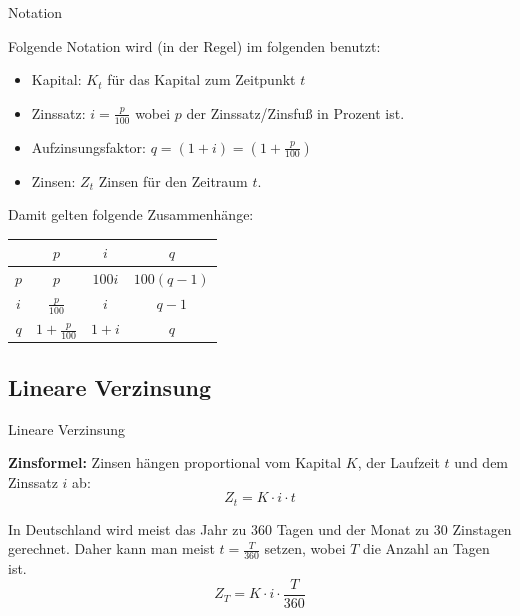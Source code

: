 \begin{frame}{Notation}
	\begin{bemerkung}
		Folgende Notation wird (in der Regel) im folgenden benutzt:
		\begin{itemize}
			\item Kapital: $K_{t}$ für das Kapital zum Zeitpunkt $t$
			\item Zinssatz: $i = \frac{p}{100}$ wobei $p$ der Zinssatz/Zinsfuß in Prozent ist.
			\item Aufzinsungsfaktor: $q = \left( 1+i \right) = \left(1 + \frac{p}{100}\right) $
			\item Zinsen: $Z_{t}$ Zinsen für den Zeitraum $t$.
		\end{itemize}
		\begin{center}
		Damit gelten folgende Zusammenhänge:
		\begin{tabular}{|c||c|c|c|}
				\hline \rule[-2ex]{0pt}{5.5ex}  & $p$ & $i$ & $q$ \\ 
				\hline \hline \rule[-2ex]{0pt}{5.5ex} $p$ & $p$ & $100 i$ & $100(q-1)$ \\ 
				\hline \rule[-2ex]{0pt}{5.5ex} $i$ & $\frac{p}{100}$ & $i$ & $q-1$ \\ 
				\hline \rule[-2ex]{0pt}{5.5ex} $q$ & $1+\frac{p}{100}$ & $1+i$ & $q$ \\ 
				\hline 
			\end{tabular}
		\end{center}
	\end{bemerkung}
\end{frame}

\subsection{Lineare Verzinsung}

\begin{frame}{Lineare Verzinsung}
	\begin{definition}
		\textbf{Zinsformel:} Zinsen hängen proportional vom Kapital $K$, der Laufzeit $t$ und dem Zinssatz $i$ ab:
		\[
			Z_{t} = K \cdot i \cdot t
		\]
	\end{definition}
	\begin{bemerkung}
		In Deutschland wird meist das Jahr zu 360 Tagen und der Monat zu 30 Zinstagen gerechnet. Daher kann man meist $t = \frac{T}{360}$ setzen, wobei $T$ die Anzahl an Tagen ist.
		\[
		Z_{T} = K \cdot i \cdot \frac{T}{360}
		\]
	\end{bemerkung}
\end{frame}

